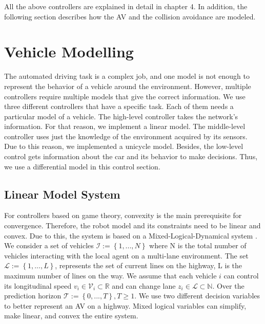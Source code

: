 All the above controllers are explained in detail in chapter 4. In addition, the following section describes how the AV and the collision avoidance are modeled. 






\section{Vehicle Modelling}

The automated driving task is a complex job, and one model is not enough to represent the behavior of a vehicle around the environment. However, multiple controllers require multiple models that give the correct information. We use three different controllers that have a specific task. Each of them needs a particular model of a vehicle. The high-level controller takes the network's information. For that reason, we implement a linear model. The middle-level controller uses just the knowledge of the environment acquired by its sensors. Due to this reason, we implemented a unicycle model. Besides, the low-level control gets information about the car and its behavior to make decisions. Thus, we use a differential model in this control section. 


\subsection{Linear Model System}
For controllers based on game theory, convexity is the main prerequisite for convergence. Therefore, the robot model and its constraints need to be linear and convex. Due to this, the system is based on a Mixed-Logical-Dynamical system \cite{BEMPORAD1999407}. We consider a set of vehicles $\mathcal{I}:= \left \{ 1, ..., N \right \}$ where N is the total number of vehicles interacting with the local agent on a multi-lane environment. The set  $\mathcal{L}:= \left \{ 1, ..., L \right \}$, represents the set of current lines on the highway, L is the maximum number of lines on the way. We assume that each vehicle $i$ can control its longitudinal speed $v_i \in \mathcal{V}_i \subset \mathbb{R}$  and can change lane $z_i \in \mathcal{L} \subset \mathbb{N}$. Over the prediction horizon $\mathcal{T} := \left \{ 0, ... ,T \right \} , T\geq 1$. We use two different decision variables to better represent an AV on a highway. Mixed logical variables can simplify, make linear, and convex the entire system. 

